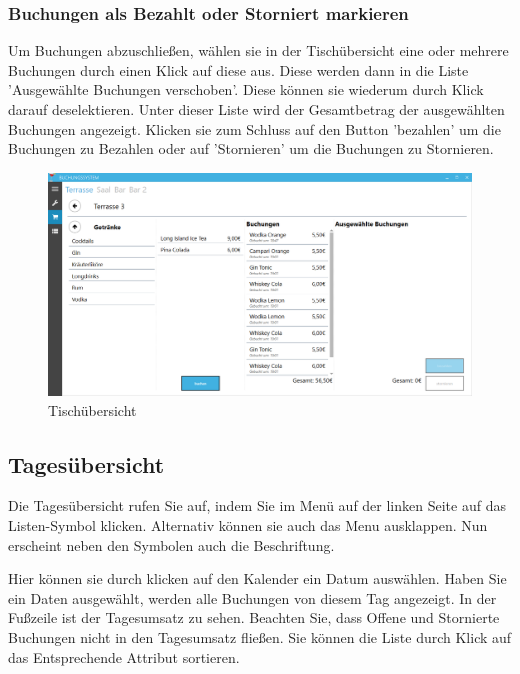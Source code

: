 \subsubsection{Buchungen als Bezahlt oder Storniert markieren}

Um Buchungen abzuschließen, wählen sie in der Tischübersicht eine oder mehrere Buchungen durch einen Klick auf diese aus. Diese werden dann in die Liste 'Ausgewählte Buchungen verschoben'. Diese können sie wiederum durch Klick darauf deselektieren.
Unter dieser Liste wird der Gesamtbetrag der ausgewählten Buchungen angezeigt. Klicken sie zum Schluss auf den Button 'bezahlen' um die Buchungen zu Bezahlen oder auf 'Stornieren' um die Buchungen zu Stornieren.

\begin{figure}[h]
	\begin{center}
		\includegraphics[width=\columnwidth]{Benutzerhandbuch/Buchungen.png}
	\end{center}
	\caption{Tischübersicht}
	\label{fig:table-overview}
\end{figure}

\subsection{Tagesübersicht}

Die Tagesübersicht rufen Sie auf, indem Sie im Menü auf der linken Seite auf das Listen-Symbol klicken. Alternativ können sie auch das Menu ausklappen. Nun erscheint neben den Symbolen auch die Beschriftung.

Hier können sie durch klicken auf den Kalender ein Datum auswählen. Haben Sie ein Daten ausgewählt, werden alle Buchungen von diesem Tag angezeigt. In der Fußzeile ist der Tagesumsatz zu sehen.
Beachten Sie, dass Offene und Stornierte Buchungen nicht in den Tagesumsatz fließen. Sie können die Liste durch Klick auf das Entsprechende Attribut sortieren.